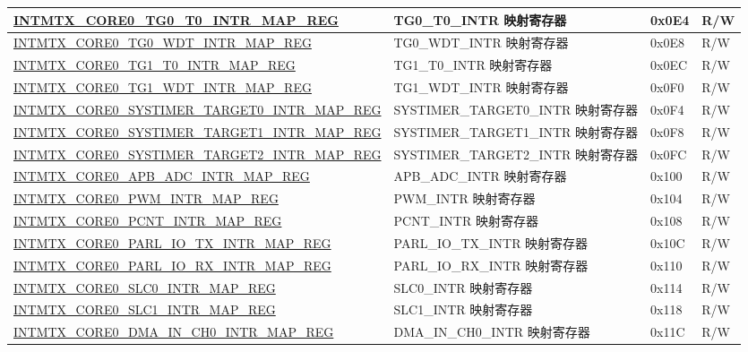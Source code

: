 \begin{longtable}{ | p{10cm} | p{10cm} | p{1.3cm} | p{1cm} | }
\hyperref[regdesc:INTMTXCORE0TG0T0INTRMAPREG]{INTMTX\_CORE0\_TG0\_T0\_INTR\_MAP\_REG} & TG0\_T0\_INTR 映射寄存器 & 0x0E4 & R/W  \\ \hline
\hyperref[regdesc:INTMTXCORE0TG0WDTINTRMAPREG]{INTMTX\_CORE0\_TG0\_WDT\_INTR\_MAP\_REG} & TG0\_WDT\_INTR 映射寄存器 & 0x0E8 & R/W  \\ \hline
\hyperref[regdesc:INTMTXCORE0TG1T0INTRMAPREG]{INTMTX\_CORE0\_TG1\_T0\_INTR\_MAP\_REG} & TG1\_T0\_INTR 映射寄存器 & 0x0EC & R/W  \\ \hline
\hyperref[regdesc:INTMTXCORE0TG1WDTINTRMAPREG]{INTMTX\_CORE0\_TG1\_WDT\_INTR\_MAP\_REG} & TG1\_WDT\_INTR 映射寄存器 & 0x0F0 & R/W  \\ \hline
\hyperref[regdesc:INTMTXCORE0SYSTIMERTARGET0INTRMAPREG]{INTMTX\_CORE0\_SYSTIMER\_TARGET0\_INTR\_MAP\_REG} & SYSTIMER\_TARGET0\_INTR 映射寄存器 & 0x0F4 & R/W  \\ \hline
\hyperref[regdesc:INTMTXCORE0SYSTIMERTARGET1INTRMAPREG]{INTMTX\_CORE0\_SYSTIMER\_TARGET1\_INTR\_MAP\_REG} & SYSTIMER\_TARGET1\_INTR 映射寄存器 & 0x0F8 & R/W  \\ \hline
\hyperref[regdesc:INTMTXCORE0SYSTIMERTARGET2INTRMAPREG]{INTMTX\_CORE0\_SYSTIMER\_TARGET2\_INTR\_MAP\_REG} & SYSTIMER\_TARGET2\_INTR 映射寄存器 & 0x0FC & R/W  \\ \hline
\hyperref[regdesc:INTMTXCORE0APBADCINTRMAPREG]{INTMTX\_CORE0\_APB\_ADC\_INTR\_MAP\_REG} & APB\_ADC\_INTR 映射寄存器 & 0x100 & R/W  \\ \hline
\hyperref[regdesc:INTMTXCORE0PWMINTRMAPREG]{INTMTX\_CORE0\_PWM\_INTR\_MAP\_REG} & PWM\_INTR 映射寄存器 & 0x104 & R/W  \\ \hline
\hyperref[regdesc:INTMTXCORE0PCNTINTRMAPREG]{INTMTX\_CORE0\_PCNT\_INTR\_MAP\_REG} & PCNT\_INTR 映射寄存器 & 0x108 & R/W  \\ \hline
\hyperref[regdesc:INTMTXCORE0PARLIOTXINTRMAPREG]{INTMTX\_CORE0\_PARL\_IO\_TX\_INTR\_MAP\_REG} & PARL\_IO\_TX\_INTR 映射寄存器 & 0x10C & R/W  \\ \hline
\hyperref[regdesc:INTMTXCORE0PARLIORXINTRMAPREG]{INTMTX\_CORE0\_PARL\_IO\_RX\_INTR\_MAP\_REG} & PARL\_IO\_RX\_INTR 映射寄存器 & 0x110 & R/W  \\ \hline
\hyperref[regdesc:INTMTXCORE0SLC0INTRMAPREG]{INTMTX\_CORE0\_SLC0\_INTR\_MAP\_REG} & SLC0\_INTR 映射寄存器 & 0x114 & R/W  \\ \hline
\hyperref[regdesc:INTMTXCORE0SLC1INTRMAPREG]{INTMTX\_CORE0\_SLC1\_INTR\_MAP\_REG} & SLC1\_INTR 映射寄存器 & 0x118 & R/W  \\ \hline
\hyperref[regdesc:INTMTXCORE0DMAINCH0INTRMAPREG]{INTMTX\_CORE0\_DMA\_IN\_CH0\_INTR\_MAP\_REG} & DMA\_IN\_CH0\_INTR 映射寄存器 & 0x11C & R/W  \\ \hline

\end{longtable}
